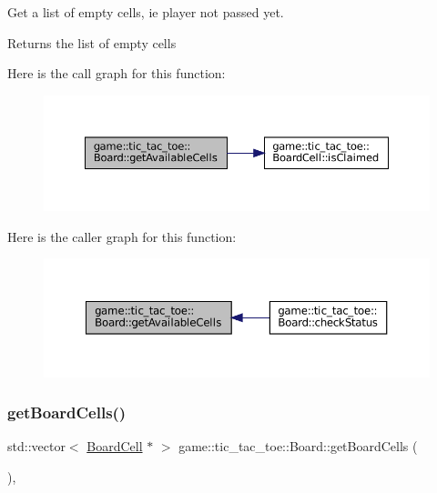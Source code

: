 Get a list of empty cells, ie player not passed yet. 

\begin{DoxyReturn}{Returns}
the list of empty cells 
\end{DoxyReturn}
Here is the call graph for this function\+:
\nopagebreak
\begin{figure}[H]
\begin{center}
\leavevmode
\includegraphics[width=350pt]{classgame_1_1tic__tac__toe_1_1_board_a68eea4b31da1c8b4cf90ff0d6bc9d232_cgraph}
\end{center}
\end{figure}
Here is the caller graph for this function\+:
\nopagebreak
\begin{figure}[H]
\begin{center}
\leavevmode
\includegraphics[width=350pt]{classgame_1_1tic__tac__toe_1_1_board_a68eea4b31da1c8b4cf90ff0d6bc9d232_icgraph}
\end{center}
\end{figure}
\mbox{\label{classgame_1_1tic__tac__toe_1_1_board_af8bc9dc8a2cfed68aa7d9adead27594e}} 
\subsubsection{\texorpdfstring{get\+Board\+Cells()}{getBoardCells()}}
{\footnotesize\ttfamily std\+::vector$<$ \hyperlink{classgame_1_1tic__tac__toe_1_1_board_cell}{Board\+Cell} $\ast$ $>$ game\+::tic\+\_\+tac\+\_\+toe\+::\+Board\+::get\+Board\+Cells (\begin{DoxyParamCaption}{ }\end{DoxyParamCaption})\hspace{0.3cm}{\ttfamily [override]}, {\ttfamily [virtual]}}



